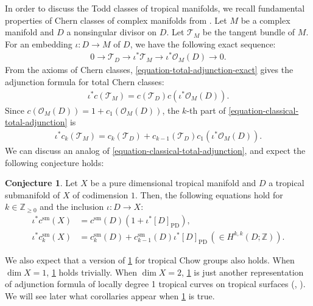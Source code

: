 \documentclass[a4paper,dvipdfmx,reqno,12pt]{amsart}
\theoremstyle{definition}
\newtheorem{conjecture}[theorem]{Conjecture}
\newcommand{\PD}[1]{[#1]_{\mathrm{PD}}}
\numberwithin{equation}{section}
\begin{document}
In order to discuss the Todd classes of
tropical manifolds, we recall fundamental properties
of Chern classes of complex manifolds from
\cite{MR1335917,MR1644323,MR2810322}.
Let $M$ be a complex manifold and 
$D$ a nonsingular
divisor on $D$. Let $\mathcal{T}_M$ be the tangent
bundle of $M$.
For an embedding $\iota\colon D\to M$ of
$D$, we have the following
exact sequence: 
\begin{align}
\label{equation-total-adjunction-exact}
0 \to \mathcal{T}_{D}\to \iota^{*}\mathcal{T}_M
\to \iota^{*}\mathcal{O}_M(D)\to 0.
\end{align}
From the axioms of Chern classes,
\eqref{equation-total-adjunction-exact} gives 
the adjunction formula for total Chern classes:
\begin{align}
\label{equation-classical-total-adjunction}
\iota^{*}c(\mathcal{T}_M)
=c(\mathcal{T}_{D})c(\iota^{*}\mathcal{O}_M(D)).
\end{align}
Since $c(\mathcal{O}_M(D))=1+c_1(\mathcal{O}_M(D))$, 
the $k$-th part of \eqref{equation-classical-total-adjunction}
is
\begin{align}
\label{equation-classical-total-adjunction-2}
\iota^{*}c_k(\mathcal{T}_M)
=c_{k}(\mathcal{T}_{D})+
c_{k-1}(\mathcal{T}_{D})c_1(\iota^{*}\mathcal{O}_M(D)).
\end{align}
We can discuss an analog of 
\eqref{equation-classical-total-adjunction},
and expect the following conjecture holds:
\begin{conjecture}
\label{conjecture-grr-divisor}
Let $X$ be a pure dimensional tropical manifold
and $D$ a tropical submanifold of $X$ of codimension $1$.
Then, the following equations hold for 
$k\in \mathbb{Z}_{\geq 0}$ and the inclusion 
$\iota\colon D \to X$:
\begin{align}
\label{equation-total-adjunction}
\iota^{*}c^{\mathrm{sm}}(X)&=c^{\mathrm{sm}}(D)
(1+\iota^{*}\PD{D}), \\ 
\iota^{*}c^{\mathrm{sm}}_k(X)&=c^{\mathrm{sm}}_k(D)+
c^{\mathrm{sm}}_{k-1}(D)\iota^{*}\PD{D} \,
(\in H^{k,k}(D;\mathbb{Z})).
\end{align}
\end{conjecture}
We also expect that a version
of \cref{conjecture-grr-divisor} for tropical
Chow groups \cite[Definition 3.30]{shaw2015tropical}
also holds.
When $\dim X=1$, \cref{conjecture-grr-divisor} holds
trivially. When $\dim X=2$,
\cref{conjecture-grr-divisor}
is just another representation of adjunction formula
of locally degree 1 tropical curves on tropical surfaces
(\cite[Theorem 6]{shaw2015tropical},
\cite[Theorem 5.2]{demedrano2023chern}).
We will see later what 
corollaries appear
when \cref{conjecture-grr-divisor} is true.  
\end{document}
